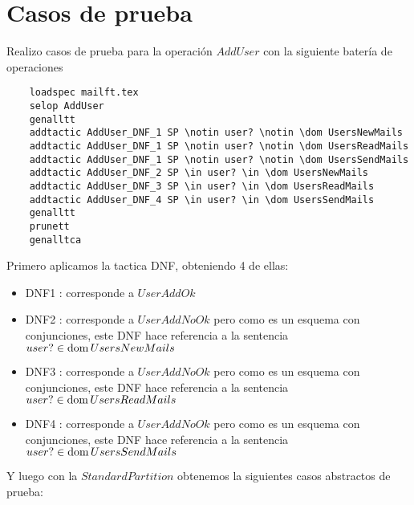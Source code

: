 \section{Casos de prueba}
Realizo casos de prueba para la operación $AddUser$ con la siguiente batería de operaciones
\begin{verbatim}
    loadspec mailft.tex
    selop AddUser
    genalltt
    addtactic AddUser_DNF_1 SP \notin user? \notin \dom UsersNewMails
    addtactic AddUser_DNF_1 SP \notin user? \notin \dom UsersReadMails
    addtactic AddUser_DNF_1 SP \notin user? \notin \dom UsersSendMails
    addtactic AddUser_DNF_2 SP \in user? \in \dom UsersNewMails
    addtactic AddUser_DNF_3 SP \in user? \in \dom UsersReadMails
    addtactic AddUser_DNF_4 SP \in user? \in \dom UsersSendMails
    genalltt
    prunett
    genalltca
\end{verbatim}
Primero aplicamos la tactica DNF, obteniendo 4 de ellas:
\begin{itemize}
    \item DNF1 : corresponde a $UserAddOk$
    \item DNF2 : corresponde a $UserAddNoOk$ pero como es un esquema con conjunciones, este DNF hace referencia a la sentencia $user? \in \mathop{\mathrm{dom}} UsersNewMails$
    \item DNF3 : corresponde a $UserAddNoOk$ pero como es un esquema con conjunciones, este DNF hace referencia a la sentencia $user? \in \mathop{\mathrm{dom}} UsersReadMails$
    \item DNF4 : corresponde a $UserAddNoOk$ pero como es un esquema con conjunciones, este DNF hace referencia a la sentencia $user? \in \mathop{\mathrm{dom}} UsersSendMails$
\end{itemize}
\newpage
Y luego con la $Standard Partition$ obtenemos la siguientes casos abstractos de prueba:


